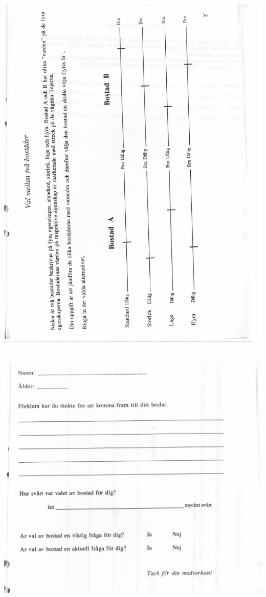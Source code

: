 \section{}\label{app:b}\includegraphics[height=.9\textheight]{Appendencies/AppendixB}\clearpage
\section{}\label{app:c}\includegraphics{Appendencies/AppendixC}\clearpage
